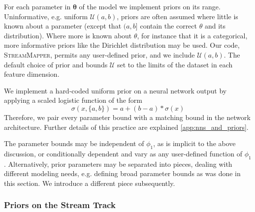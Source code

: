 \documentclass[twocolumn]{aastex631}
\newcommand{\code}[1]{\textsc{#1}}
\newcommand{\package}[1]{\code{#1}}
\newcommand{\mbs}[1]{\boldsymbol{#1}}
\newcommand{\mcal}[1]{\mathcal{#1}}
\begin{document}
            For each parameter in $\mbs{\theta}$ of the model we implement
            priors on its range.  Uninformative, e.g. uniform $\mcal{U}(a, b)$,
            priors are often assumed where little is known about a parameter
            (except that $(a,b]$ contain the correct $\theta$ and its
            distribution). Where more is known about $\theta$, for instance that
            it is a categorical, more informative priors like the Dirichlet
            distribution \citep{Christopher2016} may be used. Our code,
            \package{StreamMapper}, permits any user-defined prior, and we
            include $\mcal{U}(a, b)$.  The default choice of prior and bounds
            $\mcal{U}$ set to the limits of the dataset in each feature
            dimension.

            We implement a hard-coded uniform prior on a neural network output
            by applying a scaled logistic function of the form
            \begin{equation}\label{eq:scaled_logistic}
                  \sigma(x, \{a,b\}) = a + (b - a) * \sigma(x)
            \end{equation}
            Therefore, we pair every parameter bound with a matching bound in
            the network architecture. Further details of this practice are
            explained \autoref{app:nns_and_priors}.

            The parameter bounds may be independent of $\phi_1$, as is implicit
            to the above discussion, or conditionally dependent and vary as any
            user-defined function of $\phi_1$.  Alternatively, prior parameters
            may be separated into pieces, dealing with different modeling needs,
            e.g. defining broad parameter bounds as was done in this section.
            We introduce a different piece subsequently.


        \subsubsection{Priors on the Stream Track} \label{sub:methods:priors:track_region_prior}
\end{document}
